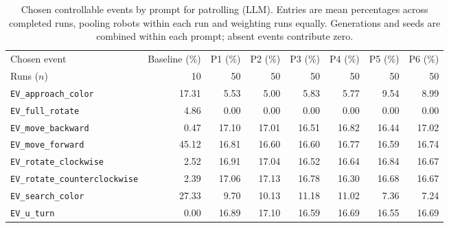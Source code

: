 \begin{table}[htbp]
\centering
\small
\caption{Chosen controllable events by prompt for patrolling (LLM). Entries are mean percentages across completed runs, pooling robots within each run and weighting runs equally. Generations and seeds are combined within each prompt; absent events contribute zero.}
\label{tab:patrolling-without-fixed-spec-prompt-events}
\begin{tabular}{lrrrrrrr}
\hline
Chosen event & Baseline (\%) & P1 (\%) & P2 (\%) & P3 (\%) & P4 (\%) & P5 (\%) & P6 (\%) \\
Runs ($n$) & 10 & 50 & 50 & 50 & 50 & 50 & 50 \\
\hline
\texttt{EV\_approach\_color} & 17.31 & 5.53 & 5.00 & 5.83 & 5.77 & 9.54 & 8.99 \\
\texttt{EV\_full\_rotate} & 4.86 & 0.00 & 0.00 & 0.00 & 0.00 & 0.00 & 0.00 \\
\texttt{EV\_move\_backward} & 0.47 & 17.10 & 17.01 & 16.51 & 16.82 & 16.44 & 17.02 \\
\texttt{EV\_move\_forward} & 45.12 & 16.81 & 16.60 & 16.60 & 16.77 & 16.59 & 16.74 \\
\texttt{EV\_rotate\_clockwise} & 2.52 & 16.91 & 17.04 & 16.52 & 16.64 & 16.84 & 16.67 \\
\texttt{EV\_rotate\_counterclockwise} & 2.39 & 17.06 & 17.13 & 16.78 & 16.30 & 16.68 & 16.67 \\
\texttt{EV\_search\_color} & 27.33 & 9.70 & 10.13 & 11.18 & 11.02 & 7.36 & 7.24 \\
\texttt{EV\_u\_turn} & 0.00 & 16.89 & 17.10 & 16.59 & 16.69 & 16.55 & 16.69 \\
\hline
\end{tabular}
\end{table}

